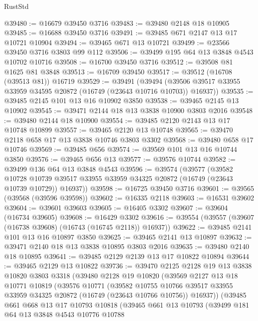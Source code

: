 \begin{lexlean}{RustStd}
\begin{coremodule}
@39480 := @16679 @39450 @3716
@39483 := @39480 @2148 @18 @10905
@39485 := @16688 @39450 @3716
@39491 := @39485 @671 @2147 @13 @17 @10721 @10904
@39494 := @39465 @671 @13 @10721
@39499 := @23566 @39450 @3716 @3803 @99 @112
@39506 := @39499 @195 @64 @13 @3848 @4543 @10702 @10716
@39508 := @16700 @39450 @3716
@39512 := @39508 @81 @1625 @81 @3848
@39513 := @16709 @39450
@39517 := @39512 (@16708 (@39513 @81)) @16719
@39529 := @39491
    (@39494 (@39506 @39517 @33955 @33959 @34595 @20872 (@16749 (@23643 @10716 @10703)) @16937))
@39535 := @39485 @2145 @101 @13 @16 @10902 @3850
@39538 := @39465 @2145 @13 @10902
@39545 := @39471 @2144 @18 @13 @3838 @10900 @3803 @2016
@39548 := @39480 @2144 @18 @10900
@39554 := @39485 @2120 @2143 @13 @17 @10748 @10899
@39557 := @39465 @2120 @13 @10748
@39565 := @39470 @2118 @658 @17 @13 @3838 @10746 @3803 @3302
@39568 := @39480 @658 @17 @10746
@39569 := @39485 @656
@39574 := @39569 @101 @13 @16 @10744 @3850
@39576 := @39465 @656 @13
@39577 := @39576 @10744
@39582 := @39499 @136 @64 @13 @3848 @4543
@39596 := @39574
    (@39577
      (@39582
        @10728
        @10739
        @39517
        @33955
        @33959
        @34325
        @20872
        (@16749 (@23643 @10739 @10729))
        @16937))
@39598 := @16725 @39450 @3716
@39601 := @39565 (@39568 (@39596 @39598))
@39602 := @16335 @2118
@39603 := @16531 @39602
@39604 := @39601 @39603
@39605 := @16405 @3302
@39607 := @39604 (@16734 @39605)
@39608 := @16429 @3302
@39616 := @39554 (@39557 (@39607 (@16738 @39608) (@16743 (@16745 @2118)) @16937))
@39622 := @39485 @2141 @101 @13 @16 @10897 @3850
@39625 := @39465 @2141 @13 @10897
@39632 := @39471 @2140 @18 @13 @3838 @10895 @3803 @2016
@39635 := @39480 @2140 @18 @10895
@39641 := @39485 @2129 @2139 @13 @17 @10822 @10894
@39644 := @39465 @2129 @13 @10822
@39736 := @39470
    @2125
    @2128
    @19
    @13
    @3838
    @10820
    @3803
    @3318
    (@39480
      @2128
      @19
      @10820
      (@39569
        @2127
        @13
        @18
        @10771
        @10819
        (@39576
          @10771
          (@39582
            @10755
            @10766
            @39517
            @33955
            @33959
            @34325
            @20872
            (@16749 (@23643 @10766 @10756))
            @16937))
        (@39485
          @661
          @668
          @13
          @17
          @10793
          @10818
          (@39465
            @661
            @13
            @10793
            (@39499
              @181
              @64
              @13
              @3848
              @4543
              @10776
              @10788

\end{coremodule}
\end{lexlean}
